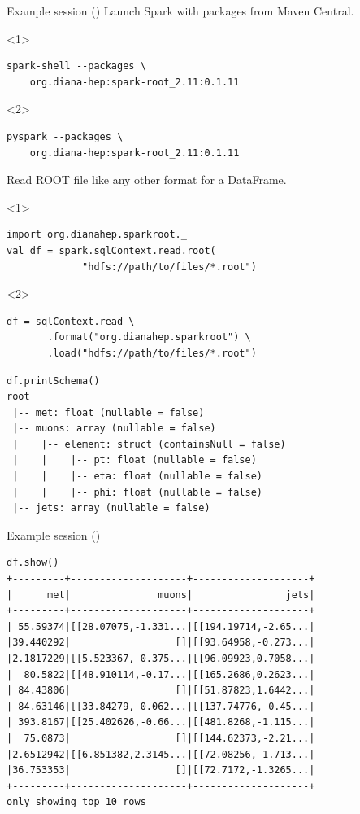 \documentclass{beamer}
\begin{document}
\begin{frame}[fragile]{Example session ()}
\vspace{0.5 cm}
Launch Spark with packages from Maven Central.
\small
\begin{onlyenv}<1>
\begin{verbatim}
spark-shell --packages \
    org.diana-hep:spark-root_2.11:0.1.11
\end{verbatim}
\end{onlyenv}
\begin{onlyenv}<2>
\begin{verbatim}
pyspark --packages \
    org.diana-hep:spark-root_2.11:0.1.11
\end{verbatim}
\end{onlyenv}

\normalsize
Read ROOT file like any other format for a DataFrame.

\small
\begin{onlyenv}<1>
\begin{verbatim}
import org.dianahep.sparkroot._
val df = spark.sqlContext.read.root(
             "hdfs://path/to/files/*.root")
\end{verbatim}
\end{onlyenv}
\begin{onlyenv}<2>
\begin{verbatim}
df = sqlContext.read \
       .format("org.dianahep.sparkroot") \
       .load("hdfs://path/to/files/*.root")
\end{verbatim}
\end{onlyenv}

\begin{verbatim}
df.printSchema()
root
 |-- met: float (nullable = false)
 |-- muons: array (nullable = false)
 |    |-- element: struct (containsNull = false)
 |    |    |-- pt: float (nullable = false)
 |    |    |-- eta: float (nullable = false)
 |    |    |-- phi: float (nullable = false)
 |-- jets: array (nullable = false)
\end{verbatim}
\end{frame}

\begin{frame}[fragile]{Example session (\only<1>{Spark}\only<2>{PySpark})}
\small
\begin{verbatim}
df.show()
+---------+--------------------+--------------------+
|      met|               muons|                jets|
+---------+--------------------+--------------------+
| 55.59374|[[28.07075,-1.331...|[[194.19714,-2.65...|
|39.440292|                  []|[[93.64958,-0.273...|
|2.1817229|[[5.523367,-0.375...|[[96.09923,0.7058...|
|  80.5822|[[48.910114,-0.17...|[[165.2686,0.2623...|
| 84.43806|                  []|[[51.87823,1.6442...|
| 84.63146|[[33.84279,-0.062...|[[137.74776,-0.45...|
| 393.8167|[[25.402626,-0.66...|[[481.8268,-1.115...|
|  75.0873|                  []|[[144.62373,-2.21...|
|2.6512942|[[6.851382,2.3145...|[[72.08256,-1.713...|
|36.753353|                  []|[[72.7172,-1.3265...|
+---------+--------------------+--------------------+
only showing top 10 rows
\end{verbatim}
\end{frame}
\end{document}
